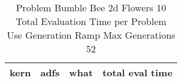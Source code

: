 \begin{table}[H]
\caption{Problem  Bumble Bee 2d  Flowers 10\\Total Evaluation Time per Problem \\ Use Generation Ramp  Max Generations 52\\}
\begin{center}
\scalebox{1.0} %
{
\begin{tabular}{lllr}
\hline
kern & adfs & what & total eval time \\
\hline


\end{tabular}
}
\end{center}
\end{table}

